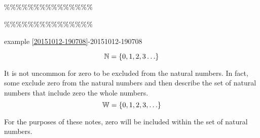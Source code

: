  \begin{exercise}
  \hfill\\
  
  
  
  \end{exercise}
  
  \begin{exercise}
  \hfill\\
  
  
  
  \end{exercise}
  
  
  \begin{exercise}
  \hfill\\
  
  
  
  \end{exercise} 
\begin{example}[id:20151012-201647] \label{20151012-201647} \hfill \\
\%\%\%\%\%\%\%\%\%\%\%\%\%\%\%



\%\%\%\%\%\%\%\%\%\%\%\%\%\%\%


example \ref{20151012-190708}-20151012-190708

\end{example}



























\begin{definition}

\[
\mathbb{N}=\left\{0, 1, 2, 3 \ldots\right\}
\]

\end{definition}

\begin{remark}
It is not uncommon for zero to be excluded from the natural numbers.  In fact, some exclude zero from the natural numbers and then describe the set of natural numbers that include zero the whole numbers. \\

\[
\mathbb{W}=\left\{0, 1, 2, 3, \ldots\right\}
\]

For the purposes of these notes, zero will be included within the set of natural numbers.
\end{remark}

